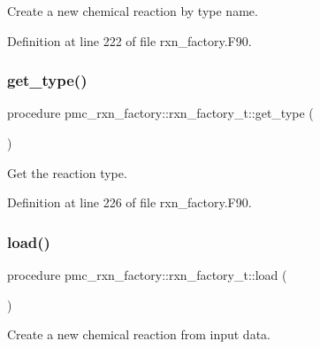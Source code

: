 Create a new chemical reaction by type name. 



Definition at line 222 of file rxn\+\_\+factory.\+F90.

\mbox{\label{structpmc__rxn__factory_1_1rxn__factory__t_a04060dbe24fcf958a0567efb98203ea3}} 
\subsubsection{\texorpdfstring{get\+\_\+type()}{get\_type()}}
{\footnotesize\ttfamily procedure pmc\+\_\+rxn\+\_\+factory\+::rxn\+\_\+factory\+\_\+t\+::get\+\_\+type (\begin{DoxyParamCaption}{ }\end{DoxyParamCaption})\hspace{0.3cm}{\ttfamily [private]}}



Get the reaction type. 



Definition at line 226 of file rxn\+\_\+factory.\+F90.

\mbox{\label{structpmc__rxn__factory_1_1rxn__factory__t_a60ed939b436b09ac0e60c43c70a69c8a}} 
\subsubsection{\texorpdfstring{load()}{load()}}
{\footnotesize\ttfamily procedure pmc\+\_\+rxn\+\_\+factory\+::rxn\+\_\+factory\+\_\+t\+::load (\begin{DoxyParamCaption}{ }\end{DoxyParamCaption})\hspace{0.3cm}{\ttfamily [private]}}



Create a new chemical reaction from input data. 



